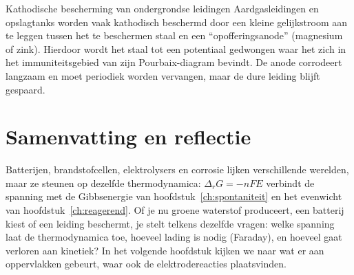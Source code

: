 \begin{toepassing}{Kathodische bescherming van ondergrondse leidingen}
Aardgasleidingen en opslagtanks worden vaak kathodisch beschermd door een kleine gelijkstroom aan te leggen tussen het te beschermen staal en een ``opofferingsanode'' (magnesium of zink). Hierdoor wordt het staal tot een potentiaal gedwongen waar het zich in het immuniteitsgebied van zijn Pourbaix-diagram bevindt. De anode corrodeert langzaam en moet periodiek worden vervangen, maar de dure leiding blijft gespaard.
\end{toepassing}

\section{Samenvatting en reflectie}

Batterijen, brandstofcellen, elektrolysers en corrosie lijken verschillende werelden, maar ze steunen op dezelfde thermodynamica: $\Delta_rG = -nFE$ verbindt de spanning met de Gibbsenergie van hoofdstuk~\ref{ch:spontaniteit} en het evenwicht van hoofdstuk~\ref{ch:reagerend}. Of je nu groene waterstof produceert, een batterij kiest of een leiding beschermt, je stelt telkens dezelfde vragen: welke spanning laat de thermodynamica toe, hoeveel lading is nodig (Faraday), en hoeveel gaat verloren aan kinetiek? In het volgende hoofdstuk kijken we naar wat er aan oppervlakken gebeurt, waar ook de elektrodereacties plaatsvinden.

